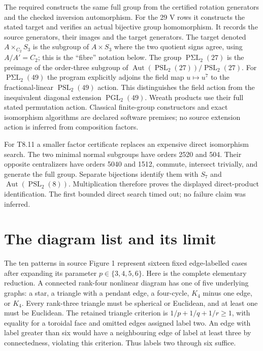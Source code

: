 \documentclass[10pt,a4paper]{article}
\begin{document}
The required  constructs the same full group from
the certified rotation generators and the checked inversion automorphism.
For the 29 V rows it constructs the stated target and verifies an actual
bijective group homomorphism. It records the source generators, their images
and the target generators. The target denoted $A\mathbin{\times_{C_2}}S_3$
is the subgroup of $A\times S_3$ where the two quotient signs agree, using
$A/A'=C_2$; this is the ``fibre'' notation below. The group
$\operatorname{P\Sigma L}_2(27)$ is the preimage of the order-three subgroup
of $\operatorname{Aut}(\operatorname{PSL}_2(27))/\operatorname{PSL}_2(27)$.
For $\operatorname{P\Sigma L}_2(49)$ the program explicitly adjoins the field
map $u\mapsto u^7$ to the fractional-linear $\operatorname{PSL}_2(49)$
action. This distinguishes the field action from the inequivalent diagonal
extension $\operatorname{PGL}_2(49)$. Wreath products use their full stated
permutation action. Classical finite-group constructors and exact isomorphism
algorithms are declared software premises; no source extension action is
inferred from composition factors.

For T8.11 a smaller factor certificate replaces an expensive direct
isomorphism search. The two minimal normal subgroups have orders 2520 and
504. Their opposite centralizers have orders 5040 and 1512, commute,
intersect trivially, and generate the full group. Separate bijections identify
them with $S_7$ and $\operatorname{Aut}(\operatorname{PSL}_2(8))$.
Multiplication therefore proves the displayed direct-product identification.
The first bounded direct search timed out; no failure claim was inferred.
\small\normalsize

\section{The diagram list and its limit}
The ten patterns in source Figure 1 represent sixteen fixed edge-labelled
cases after expanding its parameter $p\in\{3,4,5,6\}$. Here is the
complete elementary reduction. A connected rank-four nonlinear diagram
has one of five underlying graphs: a star, a triangle with a pendant
edge, a four-cycle, $K_4$ minus one edge, or $K_4$. Every rank-three
triangle must be spherical or Euclidean, and at least one must be
Euclidean. The retained triangle criterion is
$1/p+1/q+1/r\ge1$, with equality for a toroidal face and omitted
edges assigned label two. An edge with label greater than six would
have a neighbouring edge of label at least three by connectedness,
violating this criterion. Thus labels two through six suffice.
\end{document}
